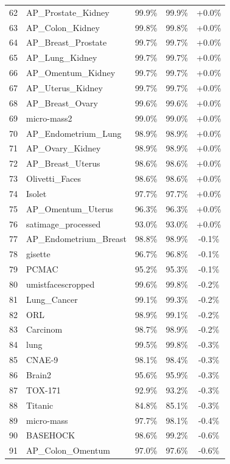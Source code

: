 \documentclass[preprint,12pt,authoryear]{elsarticle}
\begin{document}
{\begin{longtable}{|c|p{4.5cm}|c|c|c|}
62 & AP\_Prostate\_Kidney & 99.9\% & 99.9\% & +0.0\% \\
63 & AP\_Colon\_Kidney & 99.8\% & 99.8\% & +0.0\% \\
64 & AP\_Breast\_Prostate & 99.7\% & 99.7\% & +0.0\% \\
65 & AP\_Lung\_Kidney & 99.7\% & 99.7\% & +0.0\% \\
66 & AP\_Omentum\_Kidney & 99.7\% & 99.7\% & +0.0\% \\
67 & AP\_Uterus\_Kidney & 99.7\% & 99.7\% & +0.0\% \\
68 & AP\_Breast\_Ovary & 99.6\% & 99.6\% & +0.0\% \\
69 & micro-mass2 & 99.0\% & 99.0\% & +0.0\% \\
70 & AP\_Endometrium\_Lung & 98.9\% & 98.9\% & +0.0\% \\
71 & AP\_Ovary\_Kidney & 98.9\% & 98.9\% & +0.0\% \\
72 & AP\_Breast\_Uterus & 98.6\% & 98.6\% & +0.0\% \\
73 & Olivetti\_Faces & 98.6\% & 98.6\% & +0.0\% \\
74 & Isolet & 97.7\% & 97.7\% & +0.0\% \\
75 & AP\_Omentum\_Uterus & 96.3\% & 96.3\% & +0.0\% \\
76 & satimage\_processed & 93.0\% & 93.0\% & +0.0\% \\
77 & AP\_Endometrium\_Breast & 98.8\% & 98.9\% & -0.1\% \\
78 & gisette & 96.7\% & 96.8\% & -0.1\% \\
79 & PCMAC & 95.2\% & 95.3\% & -0.1\% \\
80 & umistfacescropped & 99.6\% & 99.8\% & -0.2\% \\
81 & Lung\_Cancer & 99.1\% & 99.3\% & -0.2\% \\
82 & ORL & 98.9\% & 99.1\% & -0.2\% \\
83 & Carcinom & 98.7\% & 98.9\% & -0.2\% \\
84 & lung & 99.5\% & 99.8\% & -0.3\% \\
85 & CNAE-9 & 98.1\% & 98.4\% & -0.3\% \\
86 & Brain2 & 95.6\% & 95.9\% & -0.3\% \\
87 & TOX-171 & 92.9\% & 93.2\% & -0.3\% \\
88 & Titanic & 84.8\% & 85.1\% & -0.3\% \\
89 & micro-mass & 97.7\% & 98.1\% & -0.4\% \\
90 & BASEHOCK & 98.6\% & 99.2\% & -0.6\% \\
91 & AP\_Colon\_Omentum & 97.0\% & 97.6\% & -0.6\% \\

\end{longtable}}
\end{document}
